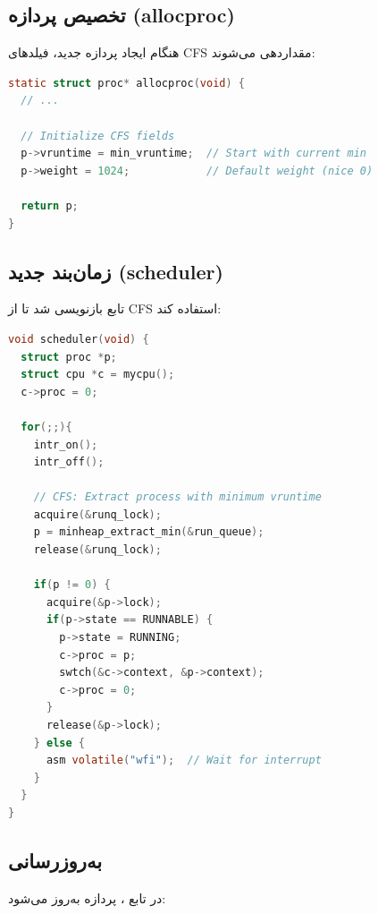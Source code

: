 \documentclass[12pt,a4paper]{article}
\begin{document}
\subsection{تخصیص پردازه (allocproc)}
هنگام ایجاد پردازه جدید، فیلدهای CFS مقداردهی می‌شوند:

\begin{latin}
\begin{lstlisting}[language=C, caption={مقداردهی فیلدهای CFS در allocproc}]
static struct proc* allocproc(void) {
  // ...
  
  // Initialize CFS fields
  p->vruntime = min_vruntime;  // Start with current min
  p->weight = 1024;            // Default weight (nice 0)
  
  return p;
}
\end{lstlisting}
\end{latin}

\subsection{زمان‌بند جدید (scheduler)}
تابع  بازنویسی شد تا از CFS استفاده کند:

\begin{latin}
\begin{lstlisting}[language=C, caption={زمان‌بند CFS}]
void scheduler(void) {
  struct proc *p;
  struct cpu *c = mycpu();
  c->proc = 0;
  
  for(;;){
    intr_on();
    intr_off();

    // CFS: Extract process with minimum vruntime
    acquire(&runq_lock);
    p = minheap_extract_min(&run_queue);
    release(&runq_lock);

    if(p != 0) {
      acquire(&p->lock);
      if(p->state == RUNNABLE) {
        p->state = RUNNING;
        c->proc = p;
        swtch(&c->context, &p->context);
        c->proc = 0;
      }
      release(&p->lock);
    } else {
      asm volatile("wfi");  // Wait for interrupt
    }
  }
}
\end{lstlisting}
\end{latin}

\subsection{به‌روزرسانی }
در تابع ،  پردازه به‌روز می‌شود:
\end{document}
